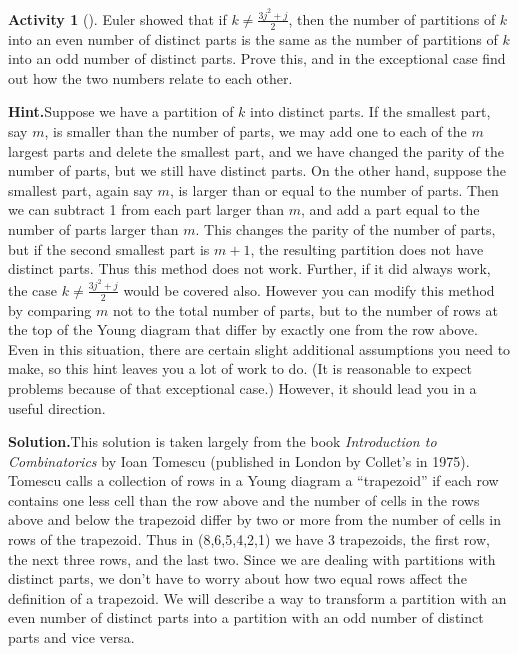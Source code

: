 \documentclass[10pt,]{book}
\theoremstyle{plain}
\theoremstyle{definition}
\newtheorem{activity}[project]{Activity}
\numberwithin{equation}{chapter}
\begin{document}
\begin{activity}[]\label{activity-165}
Euler showed that if \(k\not= \frac{3j^2+j}{2}\), then the number of partitions of \(k\) into an even number of distinct parts is the same as the number of partitions of \(k\) into an odd number of distinct parts. Prove this, and in the exceptional case find out how the two numbers relate to each other.%
\par\medskip\noindent%
\textbf{Hint.}\quad Suppose we have a partition of \(k\) into distinct parts. If the smallest part, say \(m\), is smaller than the number of parts, we may add one to each of the \(m\) largest parts and delete the smallest part, and we have changed the parity of the number of parts, but we still have distinct parts. On the other hand, suppose the smallest part, again say \(m\), is larger than or equal to the number of parts. Then we can subtract 1 from each part larger than \(m\), and add a part equal to the number of parts larger than \(m\). This changes the parity of the number of parts, but if the second smallest part is \(m+1\), the resulting partition does not have distinct parts. Thus this method does not work. Further, if it did always work, the case \(k \ne \frac{3j^2+j}{2}\) would be covered also. However you can modify this method by comparing \(m\) not to the total number of parts, but to the number of rows at the top of the Young diagram that differ by exactly one from the row above. Even in this situation, there are certain slight additional assumptions you need to make, so this hint leaves you a lot of work to do. (It is reasonable to expect problems because of that exceptional case.) However, it should lead you in a useful direction.%
\par\medskip\noindent%
\textbf{Solution.}\quad This solution is taken largely from the book \textsl{Introduction to Combinatorics} by Ioan Tomescu (published in London by Collet's in 1975). Tomescu calls a collection of rows in a Young diagram a ``trapezoid'' if each row contains one less cell than the row above and the number of cells in the rows above and below the trapezoid differ by two or more from the number of cells in rows of the trapezoid. Thus in (8,6,5,4,2,1) we have 3 trapezoids, the first row, the next three rows, and the last two. Since we are dealing with partitions with distinct parts, we don't have to worry about how two equal rows affect the definition of a trapezoid. We will describe a way to transform a partition with an even number of distinct parts into a partition with an odd number of distinct parts and vice versa.%

\end{activity}
\end{document}
